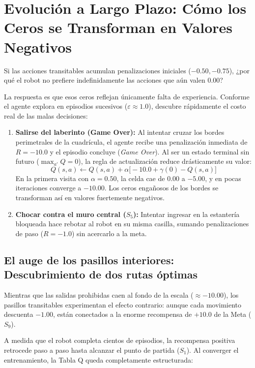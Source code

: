 \section{Evolución a Largo Plazo: Cómo los Ceros se Transforman en Valores Negativos}
Si las acciones transitables acumulan penalizaciones iniciales ($-0.50, -0.75$), ¿por qué el robot no prefiere indefinidamente las acciones que aún valen $0.00$?

La respuesta es que esos ceros reflejan únicamente falta de experiencia. Conforme el agente explora en episodios sucesivos ($\varepsilon \approx 1.0$), descubre rápidamente el costo real de las malas decisiones:

\begin{enumerate}
  \item \textbf{Salirse del laberinto (Game Over):} Al intentar cruzar los bordes perimetrales de la cuadrícula, el agente recibe una penalización inmediata de $R = -10.0$ y el episodio concluye (\textit{Game Over}). Al ser un estado terminal sin futuro ($\max_{a'} Q = 0$), la regla de actualización reduce drásticamente su valor:
  \[
    Q(s, a) \leftarrow Q(s, a) + \alpha \Big[ -10.0 + \gamma(0) - Q(s, a) \Big]
  \]
  En la primera visita con $\alpha = 0.50$, la celda cae de $0.00$ a $\mathbf{-5.00}$, y en pocas iteraciones converge a $\mathbf{-10.00}$. Los ceros engañosos de los bordes se transforman así en valores fuertemente negativos.

  \item \textbf{Chocar contra el muro central ($S_5$):} Intentar ingresar en la estantería bloqueada hace rebotar al robot en su misma casilla, sumando penalizaciones de paso ($R = -1.0$) sin acercarlo a la meta.
\end{enumerate}

\subsection{El auge de los pasillos interiores: Descubrimiento de dos rutas óptimas}
Mientras que las salidas prohibidas caen al fondo de la escala ($\approx -10.00$), los pasillos transitables experimentan el efecto contrario: aunque cada movimiento descuenta $-1.00$, están conectados a la enorme recompensa de $+10.0$ de la Meta ($S_9$). 

A medida que el robot completa cientos de episodios, la recompensa positiva retrocede paso a paso hasta alcanzar el punto de partida ($S_1$). Al converger el entrenamiento, la Tabla Q queda completamente estructurada:

